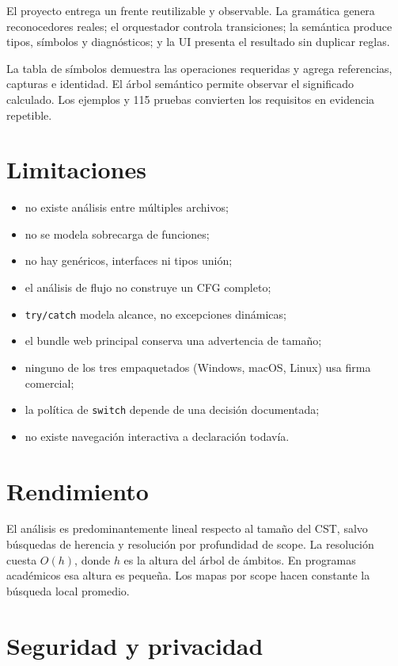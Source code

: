 \documentclass[11pt,letterpaper,oneside]{report}
\newcommand{\codigo}[1]{\texttt{#1}}
\begin{document}
El proyecto entrega un frente reutilizable y observable. La gramática genera
reconocedores reales; el orquestador controla transiciones; la semántica produce
tipos, símbolos y diagnósticos; y la UI presenta el resultado sin duplicar reglas.

La tabla de símbolos demuestra las operaciones requeridas y agrega referencias,
capturas e identidad. El árbol semántico permite observar el significado calculado.
Los ejemplos y 115 pruebas convierten los requisitos en evidencia repetible.

\section{Limitaciones}

\begin{itemize}
  \item no existe análisis entre múltiples archivos;
  \item no se modela sobrecarga de funciones;
  \item no hay genéricos, interfaces ni tipos unión;
  \item el análisis de flujo no construye un CFG completo;
  \item \codigo{try/catch} modela alcance, no excepciones dinámicas;
  \item el bundle web principal conserva una advertencia de tamaño;
  \item ninguno de los tres empaquetados (Windows, macOS, Linux) usa firma comercial;
  \item la política de \codigo{switch} depende de una decisión documentada;
  \item no existe navegación interactiva a declaración todavía.
\end{itemize}

\section{Rendimiento}

El análisis es predominantemente lineal respecto al tamaño del CST, salvo búsquedas
de herencia y resolución por profundidad de scope. La resolución cuesta
\(O(h)\), donde \(h\) es la altura del árbol de ámbitos. En programas académicos esa
altura es pequeña. Los mapas por scope hacen constante la búsqueda local promedio.

\section{Seguridad y privacidad}
\end{document}
